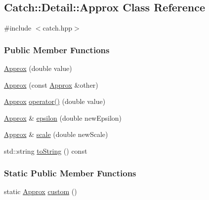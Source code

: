 \hypertarget{classCatch_1_1Detail_1_1Approx}{\subsection{Catch\-:\-:Detail\-:\-:Approx Class Reference}
\label{classCatch_1_1Detail_1_1Approx}
}


{\ttfamily \#include $<$catch.\-hpp$>$}

\subsubsection*{Public Member Functions}
\begin{DoxyCompactItemize}
\item 
\hyperlink{classCatch_1_1Detail_1_1Approx_a1a8618ea8db08c66bd3d9fe8f74b957a}{Approx} (double value)
\item 
\hyperlink{classCatch_1_1Detail_1_1Approx_a37104584a2e20000b55700f8af92fbf2}{Approx} (const \hyperlink{classCatch_1_1Detail_1_1Approx}{Approx} \&other)
\item 
\hyperlink{classCatch_1_1Detail_1_1Approx}{Approx} \hyperlink{classCatch_1_1Detail_1_1Approx_a48c9cbc28a05dc9dc8c3973b9eae2268}{operator()} (double value)
\item 
\hyperlink{classCatch_1_1Detail_1_1Approx}{Approx} \& \hyperlink{classCatch_1_1Detail_1_1Approx_a05c50c3ad0a971fab19345b5d94979a9}{epsilon} (double new\-Epsilon)
\item 
\hyperlink{classCatch_1_1Detail_1_1Approx}{Approx} \& \hyperlink{classCatch_1_1Detail_1_1Approx_acd80f0737bf38112beacd5ca95bef113}{scale} (double new\-Scale)
\item 
std\-::string \hyperlink{classCatch_1_1Detail_1_1Approx_adeb74b73506b3f6b2ba72aea15168fbe}{to\-String} () const 
\end{DoxyCompactItemize}
\subsubsection*{Static Public Member Functions}
\begin{DoxyCompactItemize}
\item 
static \hyperlink{classCatch_1_1Detail_1_1Approx}{Approx} \hyperlink{classCatch_1_1Detail_1_1Approx_aaf86dc0ee92272ac2d9839197a07951d}{custom} ()
\end{DoxyCompactItemize}
